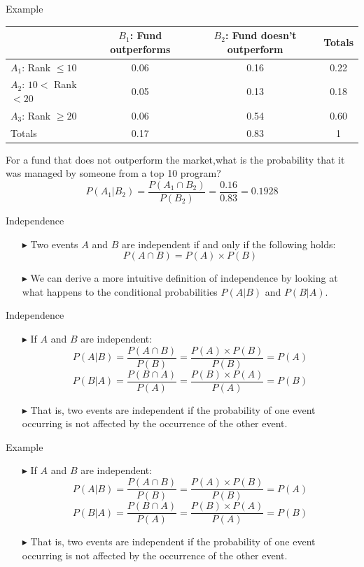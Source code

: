 \documentclass[12pt]{beamer}
\begin{document}
\begin{frame}{Example}
	\begin{center}
		\begin{tabular}{lccc}
			\toprule
			&\parbox[t]{3cm}{$B_1$: Fund \\outperforms} &\parbox[t]{3cm}{$B_2$: Fund doesn't\\ outperform}&Totals\\
			\hline
			$A_1$: Rank $\le10$&0.06&0.16&0.22\\
			$A_2$: $10<$ Rank $<20$&0.05&0.13&0.18\\
			$A_3$: Rank $\ge20$&0.06&0.54&0.60\\
			\hline
			Totals&0.17&0.83&1\\
			\bottomrule
		\end{tabular}
	\end{center}
	For a fund that does not outperform the market,what is the probability that it was managed by someone from a top 10 program?
	$$P(A_1|B_2)=\frac{P(A_1\cap B_2)}{P(B_2)}=\frac{0.16}{0.83}=0.1928$$
\end{frame}
\begin{frame}{Independence}
\begin{itemize}
	\item[\color{blue}$\blacktriangleright$] Two events $A$ and $B$ are independent if and only if the following holds:
	$$P(A\cap B)=P(A)\times P(B)$$
	\item[\color{blue}$\blacktriangleright$] We can derive a more intuitive definition of independence by looking at what happens to the conditional probabilities $P(A|B)$ and $P(B|A)$.
\end{itemize}
\end{frame}
\begin{frame}{Independence}
	\begin{itemize}
		\item[\color{blue}$\blacktriangleright$] If $A$ and $B$ are independent:
		$$P(A|B)=\frac{P(A\cap B)}{P(B)}=\frac{P(A)\times P(B)}{P(B)}=P(A)$$
		$$P(B|A)=\frac{P(B\cap A)}{P(A)}=\frac{P(B)\times P(A)}{P(A)}=P(B)$$
		\item[\color{blue}$\blacktriangleright$] That is, two events are independent if the probability of one event occurring is not affected by the occurrence of the other event.
	\end{itemize}
\end{frame}
\begin{frame}{Example}
	\begin{itemize}
		\item[\color{blue}$\blacktriangleright$] If $A$ and $B$ are independent:
		$$P(A|B)=\frac{P(A\cap B)}{P(B)}=\frac{P(A)\times P(B)}{P(B)}=P(A)$$
		$$P(B|A)=\frac{P(B\cap A)}{P(A)}=\frac{P(B)\times P(A)}{P(A)}=P(B)$$
		\item[\color{blue}$\blacktriangleright$] That is, two events are independent if the probability of one event occurring is not affected by the occurrence of the other event.
	\end{itemize}
\end{frame}
\end{document}
